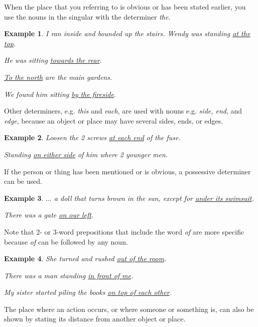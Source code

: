 \documentclass[oneside]{book}
\numberwithin{equation}{section}
\newtheorem{example}{Example}[section]
\begin{document}
%
When the place that you referring to is obvious or has been stated earlier, you use the nouns in the singular with the determiner \textit{the}.
\begin{example}
    I ran inside and bounded up the stairs. Wendy was standing \underline{at the top}.
    
    He was sitting \underline{towards the rear}.
    
    \underline{To the north} are the main gardens.
    
    We found him sitting \underline{by the fireside}.
\end{example}
Other determiners, e.g. \textit{this} and \textit{each}, are used with nouns e.g. \textit{side, end}, and \textit{edge}, because an object or place may have several sides, ends, or edges.
\begin{example}
    Loosen the 2 screws \underline{at each end} of the fuse.
    
    Standing \underline{on either side} of him where 2 younger men.
\end{example}
If the person or thing has been mentioned or is obvious, a possessive determiner can be used.
\begin{example}
    $\ldots$ a doll that turns brown in the sun, except for \underline{under its swimsuit}.
    
    There was a gate \underline{on our left}.
\end{example}
%
\noindent{} Note that 2- or 3-word prepositions that include the word \textit{of} are more specific because \textit{of} can be followed by any noun.
\begin{example}
    She turned and rushed \underline{out of the room}.
    
    There was a man standing \underline{in front of me}.
    
    My sister started piling the books \underline{on top of each other}.
\end{example}
%
\noindent{} The place where an action occurs, or where someone or something is, can also be shown by stating its distance from another object or place.
\end{document}
